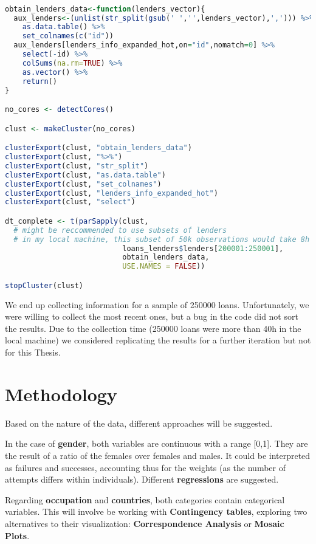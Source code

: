 \begin{lstlisting}[language={R}, frame={single}, label={lst:subsetting_data}, caption={R Code to extract lenders information from a loan}]

obtain_lenders_data<-function(lenders_vector){
  aux_lenders<-(unlist(str_split(gsub(' ','',lenders_vector),','))) %>%
    as.data.table() %>%
    set_colnames(c("id"))
  aux_lenders[lenders_info_expanded_hot,on="id",nomatch=0] %>%
    select(-id) %>%
    colSums(na.rm=TRUE) %>%
    as.vector() %>%
    return()
}

no_cores <- detectCores()

clust <- makeCluster(no_cores) 

clusterExport(clust, "obtain_lenders_data")
clusterExport(clust, "%>%")
clusterExport(clust, "str_split")
clusterExport(clust, "as.data.table")
clusterExport(clust, "set_colnames")
clusterExport(clust, "lenders_info_expanded_hot")
clusterExport(clust, "select")

dt_complete <- t(parSapply(clust,
  # might be reccommended to use subsets of lenders
  # in my local machine, this subset of 50k observations would take 8h
                           loans_lenders$lenders[200001:250001], 
                           obtain_lenders_data,
                           USE.NAMES = FALSE))

stopCluster(clust)
\end{lstlisting}

We end up collecting information for a sample of 250000 loans. Unfortunately, we were willing to collect the most recent ones, but a bug in the code did not sort the results. Due to the collection time (250000 loans were more than 40h in the local machine) we considered replicating the results for a further iteration but not for this Thesis.

\section{Methodology}
Based on the nature of the data, different approaches will be suggested. \par
In the case of \textbf{gender}, both variables are continuous with a range [0,1]. They are the result of a ratio of the females over females and males. It could be interpreted as failures and successes, accounting thus for the weights (as the number of attempts differs within individuals). Different \textbf{regressions} are suggested. \par
Regarding \textbf{occupation} and \textbf{countries}, both categories contain categorical variables. This will involve be working with \textbf{Contingency tables}, exploring two alternatives to their visualization: \textbf{Correspondence Analysis} or \textbf{Mosaic Plots}.

